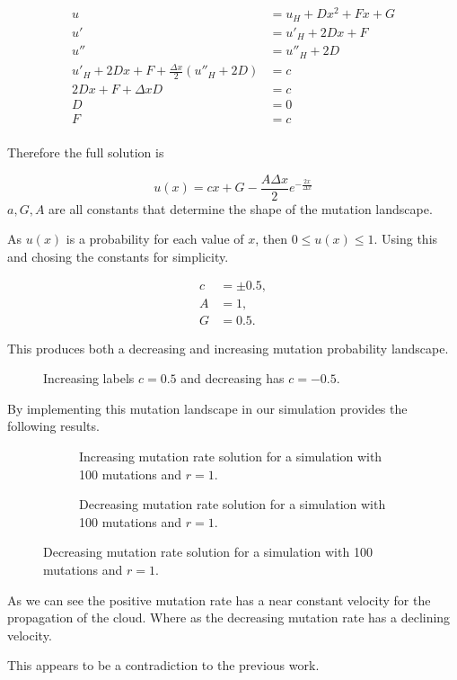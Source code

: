 \documentclass[11pt, a4paper]{article}
\begin{document}
\begin{align*}
u & = u _H + D x^2 + F x + G \\
u' & = u' _H + 2D x + F \\
u'' & = u'' _H + 2D \\
u' _H + 2D x + F + \frac{\Delta x}{2} \left( u'' _H + 2D \right) & = c \\
2Dx + F + \Delta x D & = c \\
D & = 0 \\
F & = c \\
\end{align*}

Therefore the full solution is 

\begin{equation}
u(x)  = c x  + G - \frac{A \Delta x}{2} e^{- \frac{2x}{\Delta x}}
\end{equation}
$a, G, A$ are all constants that determine the shape of the mutation landscape. 

As $u(x)$ is a probability for each value of $x$, then $ 0 \leq u(x) \leq 1 $. Using this and chosing the constants for simplicity. 

\begin{align*}
c & = \pm 0.5, \\
A & = 1, \\
G & = 0.5. 
\end{align*}

This produces both a decreasing and increasing mutation probability landscape. 

\begin{figure}[H]
\centering

\caption{Increasing labels $c =0.5$ and decreasing has $c=-0.5$. }
\end{figure}

By implementing this mutation landscape in our simulation provides the following results.

\begin{figure}[H]
	\begin{subfigure}[h]{0.5\textwidth}
			
		\caption{Increasing mutation rate solution for a simulation with 100 mutations and $r=1$.}
	\end{subfigure}
	\begin{subfigure}[h]{0.5\textwidth}
		
	\caption{Decreasing mutation rate solution for a simulation with 100 mutations and $r=1$.}
	\end{subfigure}
\end{figure}

As we can see the positive mutation rate has a near constant velocity for the propagation of the cloud. Where as the decreasing mutation rate has a declining velocity. 

This appears to be a contradiction to the previous work.
\end{document}
